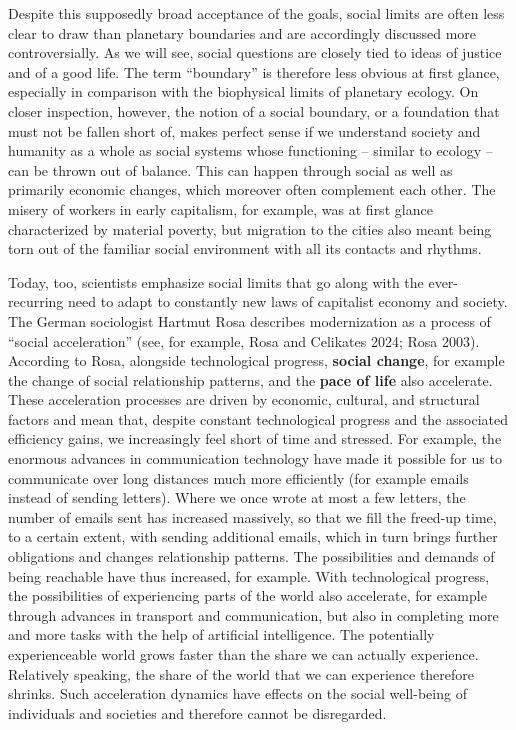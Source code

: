 \documentclass[
  british,
  a4paper,
  DIV=11,
  numbers=noendperiod,
  oneside,
  openany]{scrreprt}
\begin{document}
Despite this supposedly broad acceptance of the goals, social limits are
often less clear to draw than planetary boundaries and are accordingly
discussed more controversially. As we will see, social questions are
closely tied to ideas of justice and of a good life. The term
``boundary'' is therefore less obvious at first glance, especially in
comparison with the biophysical limits of planetary ecology. On closer
inspection, however, the notion of a social boundary, or a foundation
that must not be fallen short of, makes perfect sense if we understand
society and humanity as a whole as social systems whose functioning --
similar to ecology -- can be thrown out of balance. This can happen
through social as well as primarily economic changes, which moreover
often complement each other. The misery of workers in early capitalism,
for example, was at first glance characterized by material poverty, but
migration to the cities also meant being torn out of the familiar social
environment with all its contacts and rhythms.

Today, too, scientists emphasize social limits that go along with the
ever-recurring need to adapt to constantly new laws of capitalist
economy and society. The German sociologist Hartmut Rosa describes
modernization as a process of ``social acceleration'' (see, for example,
Rosa and Celikates 2024; Rosa 2003). According to Rosa, alongside
technological progress, \textbf{social change}, for example the change
of social relationship patterns, and the \textbf{pace of life} also
accelerate. These acceleration processes are driven by economic,
cultural, and structural factors and mean that, despite constant
technological progress and the associated efficiency gains, we
increasingly feel short of time and stressed. For example, the enormous
advances in communication technology have made it possible for us to
communicate over long distances much more efficiently (for example
emails instead of sending letters). Where we once wrote at most a few
letters, the number of emails sent has increased massively, so that we
fill the freed-up time, to a certain extent, with sending additional
emails, which in turn brings further obligations and changes
relationship patterns. The possibilities and demands of being reachable
have thus increased, for example. With technological progress, the
possibilities of experiencing parts of the world also accelerate, for
example through advances in transport and communication, but also in
completing more and more tasks with the help of artificial intelligence.
The potentially experienceable world grows faster than the share we can
actually experience. Relatively speaking, the share of the world that we
can experience therefore shrinks. Such acceleration dynamics have
effects on the social well-being of individuals and societies and
therefore cannot be disregarded.
\end{document}
